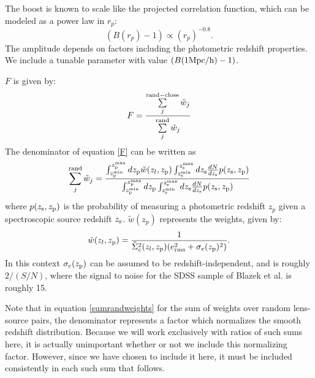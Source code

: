 \documentclass[onecolumn,amsmath,aps,fleqn, superscriptaddress]{revtex4}
\begin{document}
The boost is known to scale like the projected correlation function, which can be modeled as a power law in $r_p$: 
\begin{equation}
(B(r_p)-1) \propto (r_p)^{-0.8}.
\label{boost}
\end{equation}
The amplitude depends on factors including the photometric redshift properties. We include a tunable parameter with value $(B(1 {\rm Mpc/h})-1)$.

$F$ is given by:
\begin{equation}
F= \frac{\sum\limits_{j}^{\rm rand-close}\tilde{w}_j}{\sum\limits_{j}^{\rm rand} \tilde{w}_j} 
\label{F}
\end{equation}
The denominator of equation \ref{F} can be written as
\begin{equation}
\sum\limits_{j}^{\rm rand} \tilde{w}_j = \frac{\int_{z_{\rm p}^{\rm min}}^{z_{\rm p}^{\rm max}} d z_{\rm p} \tilde{w}(z_l, z_{\rm p}) \int_{z_{\rm s}^{\rm min}}^{z_{\rm s}^{\rm max}} dz_{\rm s} \frac{dN}{dz_{\rm s}} p(z_{\rm s}, z_{\rm p})}{\int_{z_{\rm p}^{\rm min}}^{z_{\rm p}^{\rm max}} d z_{\rm p} \int_{z_{\rm s}^{\rm min}}^{z_{\rm s}^{\rm max}} dz_{\rm s} \frac{dN}{dz_{\rm s}} p(z_{\rm s}, z_{\rm p})}
\label{sumrandweights}
\end{equation}
where $p(z_{\rm s}, z_{\rm p})$ is the probability of measuring a photometric redshift $z_p$ given a spectroscopic source redshift $z_{\rm s}$. $\tilde{w}(z_p)$ represents the weights, given by:
\begin{equation}
\tilde{w}(z_l, z_{\rm p}) = \frac{1}{\tilde{\Sigma}_c^2(z_l, z_{\rm p})(e_{\rm rms}^2 + \sigma_e(z_{\rm p})^2)}.
\label{weights}
\end{equation}
In this context $\sigma_e(z_{\rm p})$ can be assumed to be redshift-independent, and is roughly $2 / (S/N)$, where the signal to noise for the SDSS sample of Blazek et al. is roughly 15.

Note that in equation \ref{sumrandweights} for the sum of weights over random lens-source pairs, the denominator represents a factor which normalizes the smooth redshift distribution. Because we will work exclusively with ratios of such sums here, it is actually unimportant whether or not we include this normalizing factor. However, since we have chosen to include it here, it must be included consistently in each such sum that follows.
\end{document}
